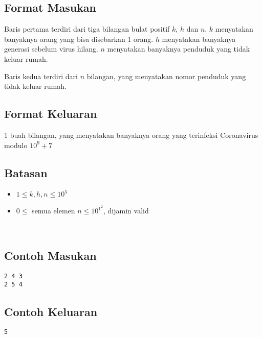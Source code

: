 \documentclass{article}
\begin{document}
\subsection*{Format Masukan}

Baris pertama terdiri dari tiga bilangan bulat positif $k$, $h$ dan $n$. $k$ menyatakan banyaknya orang yang bisa disebarkan 1 orang. $h$ menyatakan banyaknya generasi sebelum virus hilang. $n$ menyatakan banyaknya penduduk yang tidak keluar rumah.
\par
Baris kedua terdiri dari $n$ bilangan, yang menyatakan nomor penduduk yang tidak keluar rumah.

\subsection*{Format Keluaran}

1 buah bilangan, yang menyatakan banyaknya orang yang terinfeksi Coronavirus modulo $10^9+7$

\subsection*{Batasan}

\begin{itemize}
    \setlength\itemsep{0pt}
    \item $1 \leq k, h, n \leq 10^5$
    \item $0 \leq $ semua elemen $n \leq 10^1^2$, dijamin valid
\end{itemize}
\\
\begin{multicols}{2}
\subsection*{Contoh Masukan}
\begin{lstlisting}
2 4 3
2 5 4
\end{lstlisting}
\columnbreak
\subsection*{Contoh Keluaran}
\begin{lstlisting}
5
\end{lstlisting}
\vfill
\null
\end{multicols}
\end{document}
